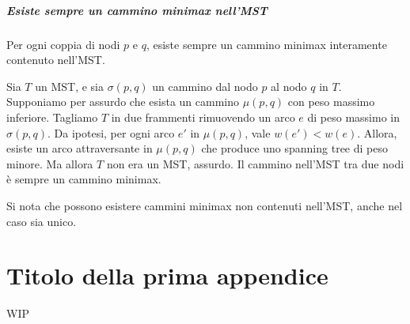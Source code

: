 \documentclass[target=bach,aauheader=,style=]{thud}
\newcommand{\eng}[1]{\foreignlanguage{english}{#1}}
\begin{document}
\paragraph{Esiste sempre un cammino minimax nell'MST}
Per ogni coppia di nodi $p$ e $q$, esiste sempre un cammino minimax interamente contenuto nell'MST.

Sia $T$ un MST, e sia $\sigma(p,q)$ un cammino dal nodo $p$ al nodo $q$ in $T$. Supponiamo per assurdo che esista un cammino $\mu(p,q)$ con peso massimo inferiore. Tagliamo $T$ in due frammenti rimuovendo un arco $e$ di peso massimo in $\sigma(p,q)$. Da ipotesi, per ogni arco $e'$ in $\mu(p,q)$, vale $w(e')<w(e)$. Allora, esiste un arco attraversante in $\mu(p,q)$ che produce uno \eng{spanning tree} di peso minore. Ma allora $T$ non era un MST, assurdo. Il cammino nell'MST tra due nodi è sempre un cammino minimax.

Si nota che possono esistere cammini minimax non contenuti nell'MST, anche nel caso sia unico.

\appendix


\chapter{Titolo della prima appendice}
WIP

\backmatter




\end{document}
